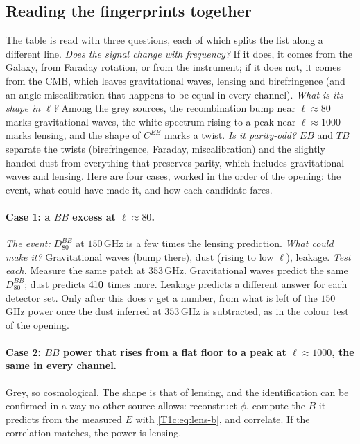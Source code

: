 \subsection{Reading the fingerprints together}
\label{T1c:sec:reading}

The table is read with three questions, each of which splits the list along a different line. \emph{Does the signal change with frequency?} If it does, it comes from the Galaxy, from Faraday rotation, or from the instrument; if it does not, it comes from the CMB, which leaves gravitational waves, lensing and birefringence (and an angle miscalibration that happens to be equal in every channel). \emph{What is its shape in $\ell$?} Among the grey sources, the recombination bump near $\ell\approx80$ marks gravitational waves, the white spectrum rising to a peak near $\ell\approx1000$ marks lensing, and the shape of $C^{EE}$ marks a twist. \emph{Is it parity-odd?} $EB$ and $TB$ separate the twists (birefringence, Faraday, miscalibration) and the slightly handed dust from everything that preserves parity, which includes gravitational waves and lensing. Here are four cases, worked in the order of the opening: the event, what could have made it, and how each candidate fares.

\paragraph{Case 1: a $BB$ excess at $\ell\approx80$.} \emph{The event:} $D_{80}^{BB}$ at $150\,$GHz is a few times the lensing prediction. \emph{What could make it?} Gravitational waves (bump there), dust (rising to low $\ell$), leakage. \emph{Test each.} Measure the same patch at $353\,$GHz. Gravitational waves predict the same $D_{80}^{BB}$; dust predicts $410$ times more. Leakage predicts a different answer for each detector set. Only after this does $r$ get a number, from what is left of the $150\,$GHz power once the dust inferred at $353\,$GHz is subtracted, as in the colour test of the opening.

\paragraph{Case 2: $BB$ power that rises from a flat floor to a peak at $\ell\approx1000$, the same in every channel.} Grey, so cosmological. The shape is that of lensing, and the identification can be confirmed in a way no other source allows: reconstruct $\phi$, compute the $B$ it predicts from the measured $E$ with \eqref{T1c:eq:lens-b}, and correlate. If the correlation matches, the power is lensing.

